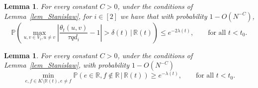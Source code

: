 \documentclass[12pt,reqno]{amsart}
\newcommand{\Prob} {\mathbb {P}}
\newcommand{\prob}[1]{\Prob\left(#1\right)}
\newcommand{\Pc}[2]{\prob{#1\,|\,#2}}
\newcommand{\R} {\mathbb R}
\newtheorem{lemma}[theorem]{Lemma}
\theoremstyle{definition}
\newcommand{\deltat}{\delta(t)}
\begin{document}
\begin{lemma}
\label{lem_thetas}
For every constant $C>0$, under the conditions of Lemma~\ref{lem_Stanislaw}, for $i \in [2]$ we have that with probability $1 - O(N^{-C})$, 
	\begin{equation}
	  \label{eq_condthetas}
	  \Pc{ \max_{u,v \in V_i, u \neq v} \left|\frac{\theta_t(u,v)}{\tau qd_{i} } - 1\right| > \deltat}{\R(t)} \le e^{ - 2\lambda(t) }, \qquad \text{for all  } t < t_0.
	\end{equation}
\end{lemma}
\begin{lemma}
  \label{lem_ef}
	For every constant $C > 0$, under the conditions of Lemma~\ref{lem_Stanislaw}, with probability $1 - O(N^{-C})$
\begin{equation}
  \label{eq_edgesNonnegligible}
	\min_{e, f \in K \setminus \R(t), e \neq f}\Pc{e \in \R, f \notin \R}{\R(t)} \ge e^{ - \lambda(t) }, \qquad \text{for all } t < t_0.
\end{equation}
\end{lemma}
\end{document}
